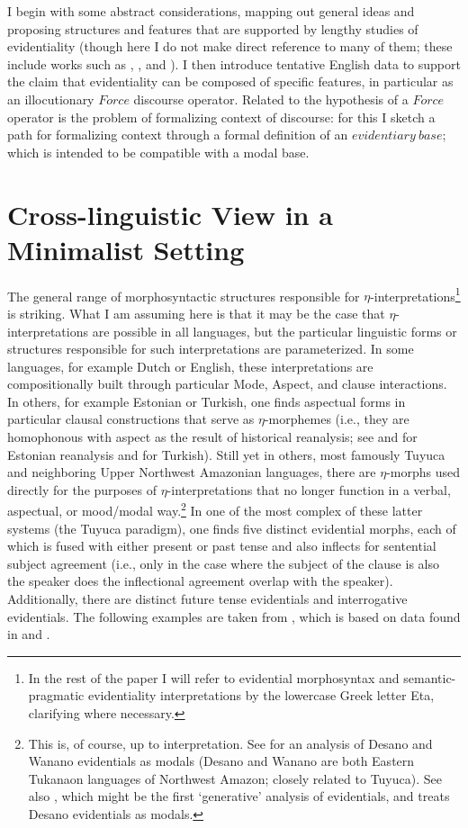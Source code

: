 \documentclass[11pt]{article}
\begin{document}
I begin with some abstract considerations, mapping out general ideas and proposing structures and features that are supported by lengthy studies of evidentiality (though here I do not make direct reference to many of them; these include works such as \cite{aikhenvald04evd}, \cite{chung05space}, \cite{garrett01evd} and \cite{faller02evd}). I then introduce tentative English data to support the claim that evidentiality can be composed of specific features, in particular as an illocutionary $Force$ discourse operator. Related to the hypothesis of a $Force$ operator is the problem of formalizing context of discourse: for this I sketch a path for formalizing context through a formal definition of an $evidentiary \ base$; which is intended to be compatible with a modal base.

\section{Cross-linguistic View in a Minimalist Setting}

The general range of morphosyntactic structures responsible for
$\eta$-interpretations\footnote{In the rest of the paper I will refer to
evidential morphosyntax and semantic-pragmatic evidentiality interpretations by
the lowercase Greek letter Eta, clarifying where necessary.} is striking. What I
am assuming here is that it may be the case that $\eta$-interpretations are
possible in {\sc all} languages, but the particular linguistic forms or
structures responsible for such interpretations are parameterized. In some languages, for example Dutch or
English, these interpretations are compositionally built through particular
Mode, Aspect, and clause interactions. In others, for example Estonian or
Turkish, one finds aspectual forms in particular clausal constructions that
serve as $\eta$-morphemes (i.e., they are homophonous with aspect as the result
of historical reanalysis; see \cite{campbell91grammestonian} and
\cite{harriscampbell95syntax} for Estonian reanalysis and
\cite{johnsonutas:2000} for Turkish). Still yet in others, most famously Tuyuca
and neighboring Upper Northwest Amazonian languages, there are $\eta$-morphs
used directly for the purposes of $\eta$-interpretations that no
longer function in a verbal, aspectual, or mood/modal way.\footnote{This is, of course, up to interpretation. See \cite{stenzel04wanano} for an analysis of Desano and Wanano evidentials as modals (Desano and Wanano are both Eastern Tukanaon languages of Northwest Amazon; closely related to Tuyuca). See also \cite{kaye:1970}, which might be the first `generative' analysis of evidentials, and treats Desano evidentials as modals.} In one of the most
complex of these latter systems (the Tuyuca paradigm), one finds five distinct
evidential morphs, each of which is fused with either present or past tense and
also inflects for sentential subject agreement (i.e., only in the case where the
subject of the clause is also the speaker does the inflectional agreement
overlap with the speaker). Additionally, there are distinct future tense evidentials and interrogative evidentials. The following examples are taken from
\cite{bowles09tuyucadata}, which is based on data found in \cite{barnes84evd,
barnes94negation, barnes96autosegments} and \cite{karn:1976}.
\end{document}
